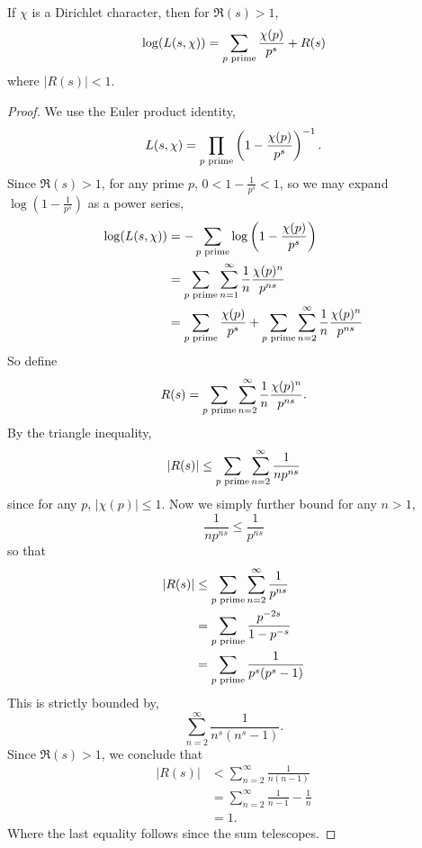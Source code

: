 \documentclass{unswmaths}
\begin{document}
    \begin{lemma}
    \label{euler}
        If $\chi$ is a Dirichlet character, then for $\Re(s) > 1$,
        \begin{equation*}
            \log(L(s,\chi)) = \sum_{p\text{ prime}} \frac{\chi(p)}{p^s} + R(s)
        \end{equation*}
        where $|R(s)| < 1$.
    \end{lemma}
    \begin{proof}
        We use the Euler product identity,
        \begin{equation*}
            L(s,\chi) = \prod_{{p\text{ prime}}}\left(1-\frac{\chi(p)}{p^s}\right)^{-1}.
        \end{equation*}
        Since $\Re(s) > 1$, for any prime $p$, $0 < 1- \frac{1}{p^s} < 1$, so we may expand
        $\log(1-\frac{1}{p^s})$ as a power series,
        \begin{align*}
            \log(L(s,\chi)) &= -\sum_{{p\text{ prime}}} \log\left(1-\frac{\chi(p)}{p^s}\right)\\
            &= \sum_{{p\text{ prime}}} \sum_{n = 1}^\infty \frac{1}{n}\frac{\chi(p)^n}{p^{ns}}\\
            &= \sum_{{p\text{ prime}}} \frac{\chi(p)}{p^s} + \sum_{{p\text{ prime}}} \sum_{n=2}^\infty \frac{1}{n}\frac{\chi(p)^n}{p^{ns}}
        \end{align*}
        So define
        \begin{equation*}
            R(s) = \sum_{{p\text{ prime}}} \sum_{n=2}^\infty \frac{1}{n}\frac{\chi(p)^n}{p^{ns}}.
        \end{equation*}
        By the triangle inequality,
        \begin{equation*}
            |R(s)| \leq \sum_{{p\text{ prime}}} \sum_{n=2}^\infty \frac{1}{np^{ns}}
        \end{equation*}
        since for any $p$, $|\chi(p)| \leq 1$. Now we simply further bound for any $n > 1$,
        \begin{equation*}
            \frac{1}{np^{ns}} \leq \frac{1}{p^{ns}}
        \end{equation*}
        so that
        \begin{align*}
            |R(s)| &\leq \sum_{{p\text{ prime}}} \sum_{n=2}^\infty \frac{1}{p^{ns}}\\
            &= \sum_{{p\text{ prime}}} \frac{p^{-2s}}{1-p^{-s}}\\
            &= \sum_{{p\text{ prime}}} \frac{1}{p^s(p^s-1)}
        \end{align*}
        This is strictly bounded by,
        \begin{equation*}
            \sum_{n=2}^\infty \frac{1}{n^s(n^s-1)}.
        \end{equation*}
        Since $\Re(s) > 1$, we conclude that
        \begin{align*}
            |R(s)| &< \sum_{n=2}^\infty \frac{1}{n(n-1)}\\
            &= \sum_{n=2}^\infty \frac{1}{n-1}-\frac{1}{n}\\
            &= 1.
        \end{align*}
        Where the last equality follows since the sum telescopes.
    \end{proof}
    
\end{document}
